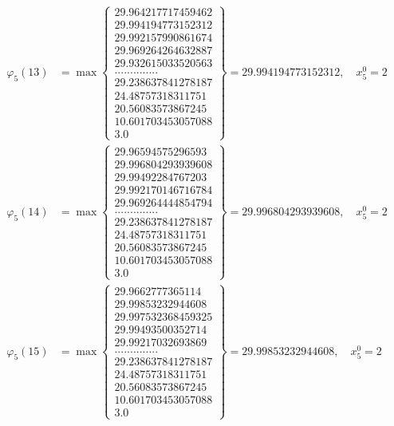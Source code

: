 \documentclass{article}
\begin{document}
\begin{align*}
  
  
  
\varphi_{5}(13) &= \max \left\{ \begin{array}{c}
29.964217717459462 \\
 29.994194773152312 \\
 29.992157990861674 \\
 29.969264264632887 \\
 29.932615033520563 \\
 .............. \\
 29.238637841278187 \\
 24.48757318311751 \\
 20.56083573867245 \\
 10.601703453057088 \\
 3.0
\end{array} \right\} = 29.994194773152312, \quad x_{5}^0 = 2\\
  
  
  
  
\varphi_{5}(14) &= \max \left\{ \begin{array}{c}
29.96594575296593 \\
 29.996804293939608 \\
 29.99492284767203 \\
 29.992170146716784 \\
 29.969264444854794 \\
 .............. \\
 29.238637841278187 \\
 24.48757318311751 \\
 20.56083573867245 \\
 10.601703453057088 \\
 3.0
\end{array} \right\} = 29.996804293939608, \quad x_{5}^0 = 2\\
  
  
  
  
\varphi_{5}(15) &= \max \left\{ \begin{array}{c}
29.9662777365114 \\
 29.99853232944608 \\
 29.997532368459325 \\
 29.99493500352714 \\
 29.99217032693869 \\
 .............. \\
 29.238637841278187 \\
 24.48757318311751 \\
 20.56083573867245 \\
 10.601703453057088 \\
 3.0
\end{array} \right\} = 29.99853232944608, \quad x_{5}^0 = 2\\
  

\end{align*}
\end{document}
